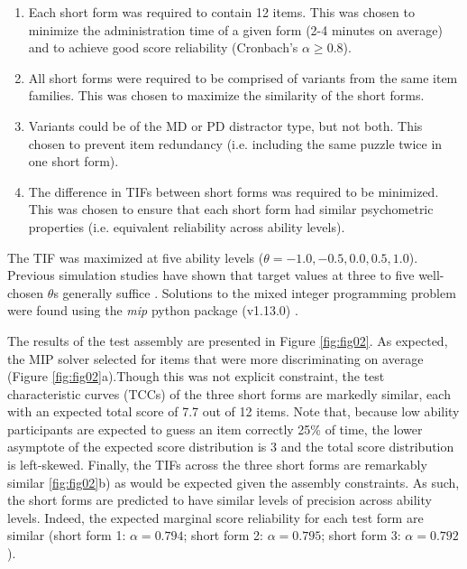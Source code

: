\documentclass[a4paper,man,natbib]{apa6}
\begin{document}
\begin{enumerate}

    \item Each short form was required to contain 12 items. This was chosen to minimize the administration time of a given form (2-4 minutes on average) and to achieve good score reliability (Cronbach's $\alpha \geq 0.8$).
    
    \item All short forms were required to be comprised of variants from the same item families. This was chosen to maximize the similarity of the short forms.
    
    \item Variants could be of the MD or PD distractor type, but not both. This chosen to prevent item redundancy (i.e. including the same puzzle twice in one short form).
    
    \item The difference in TIFs between short forms was required to be minimized. This was chosen to ensure that each short form had similar psychometric properties (i.e. equivalent reliability across ability levels). 
    
\end{enumerate}

\noindent The TIF was maximized at five ability levels ($\theta = -1.0, -0.5, 0.0, 0.5, 1.0$). Previous simulation studies have shown that target values at three to five well-chosen $\theta$s generally suffice \citep{der2005wj}. Solutions to the mixed integer programming problem were found using the \textit{mip} python package (v1.13.0) \citep{santos2020mixed}.

The results of the test assembly are presented in Figure \ref{fig:fig02}. As expected, the MIP solver selected for items that were more discriminating on average (Figure \ref{fig:fig02}a).Though this was not explicit constraint, the test characteristic curves (TCCs) of the three short forms are markedly similar, each with an expected total score of 7.7 out of 12 items. Note that, because low ability participants are expected to guess an item correctly 25\% of time, the lower asymptote of the expected score distribution is 3 and the total score distribution is left-skewed. Finally, the TIFs across the three short forms are remarkably similar \ref{fig:fig02}b) as would be expected given the assembly constraints. As such, the short forms are predicted to have similar levels of precision across ability levels. Indeed, the expected marginal score reliability for each test form are similar (short form 1: $\alpha = 0.794$; short form 2: $\alpha = 0.795$; short form 3: $\alpha = 0.792$). 
\end{document}
